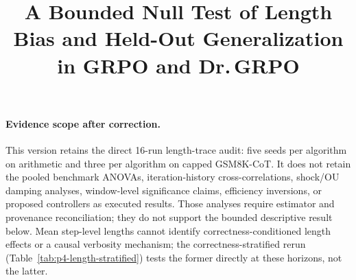 \documentclass{article}
\title{A Bounded Null Test of Length Bias and Held-Out Generalization\\
       in GRPO and Dr.\,GRPO}
\begin{document}
\sloppy {}  \hfuzz=2pt
\maketitle


\paragraph{Evidence scope after correction.}
This version retains the direct 16-run length-trace audit: five seeds per
algorithm on arithmetic and three per algorithm on capped GSM8K-CoT.
It does not retain the pooled benchmark ANOVAs, iteration-history
cross-correlations, shock/OU damping analyses, window-level significance
claims, efficiency inversions, or proposed controllers as executed results.
Those analyses require estimator and provenance reconciliation; they do not
support the bounded descriptive result below. Mean step-level lengths cannot
identify correctness-conditioned length effects or a causal verbosity mechanism;
the correctness-stratified rerun (Table~\ref{tab:p4-length-stratified}) tests the
former directly at these horizons, not the latter.





\end{document}
